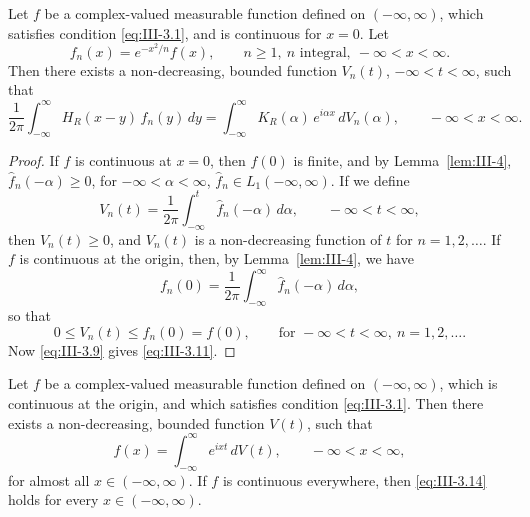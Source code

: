 \begin{lemma}\label{lem:III-6}
Let $f$ be a complex-valued measurable function defined on $(-\infty,\infty)$, which satisfies condition \eqref{eq:III-3.1}, and is continuous for $x=0$. Let
\begin{equation}\tag{3.10}\label{eq:III-3.10}
f_{n}(x)=e^{-x^{2}/n}f(x),\qquad n\ge1,\ n\text{ integral},\ -\infty<x<\infty.
\end{equation}
Then there exists a non-decreasing, bounded function $V_{n}(t)$, $-\infty<t<\infty$, such that
\begin{equation}\tag{3.11}\label{eq:III-3.11}
\frac{1}{2\pi}\int_{-\infty}^{\infty}H_{R}(x-y)\,f_{n}(y)\,dy
=\int_{-\infty}^{\infty}K_{R}(\alpha)\,e^{i\alpha x}\,dV_{n}(\alpha),\qquad-\infty<x<\infty.
\end{equation}
\end{lemma}

\begin{proof}
If $f$ is continuous at $x=0$, then $f(0)$ is finite, and by Lemma~\ref{lem:III-4}, $\hat f_{n}(-\alpha)\ge0$, for $-\infty<\alpha<\infty$, $\hat f_{n}\in L_{1}(-\infty,\infty)$. If we define
\begin{equation}\tag{3.12}\label{eq:III-3.12}
V_{n}(t)=\frac{1}{2\pi}\int_{-\infty}^{t}\hat f_{n}(-\alpha)\,d\alpha,\qquad-\infty<t<\infty,
\end{equation}
then $V_{n}(t)\ge0$, and $V_{n}(t)$ is a non-decreasing function of $t$ for $n=1,2,\dots$. If $f$ is continuous at the origin, then, by Lemma~\ref{lem:III-4}, we have
\[
f_{n}(0)=\frac{1}{2\pi}\int_{-\infty}^{\infty}\hat f_{n}(-\alpha)\,d\alpha,
\]
so that
\begin{equation}\tag{3.13}\label{eq:III-3.13}
0\le V_{n}(t)\le f_{n}(0)=f(0),\qquad\text{for }-\infty<t<\infty,\ n=1,2,\dots.
\end{equation}
Now \eqref{eq:III-3.9} gives \eqref{eq:III-3.11}.
\end{proof}

\begin{theorem}\label{thm:III-5}
Let $f$ be a complex-valued measurable function defined on $(-\infty,\infty)$, which is continuous at the origin, and which satisfies condition \eqref{eq:III-3.1}. Then there exists a non-decreasing, bounded function $V(t)$, such that
\begin{equation}\tag{3.14}\label{eq:III-3.14}
f(x)=\int_{-\infty}^{\infty}e^{ixt}\,dV(t),\qquad-\infty<x<\infty,
\end{equation}
for almost all $x\in(-\infty,\infty)$. If $f$ is continuous everywhere, then \eqref{eq:III-3.14} holds for every $x\in(-\infty,\infty)$.
\end{theorem}

